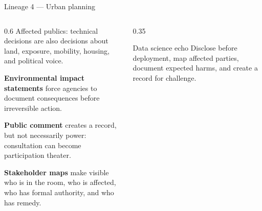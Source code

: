 \documentclass[9pt,aspectratio=169]{beamer}
\begin{document}
\begin{frame}{Lineage 4 --- Urban planning}
    \begin{columns}[T]
        \begin{column}{0.6\textwidth}
            Affected publics: technical decisions are also decisions about land, exposure, mobility, housing, and political voice.

            \medskip

            \textbf{Environmental impact statements} force agencies to document consequences before irreversible action.

            \medskip

            \textbf{Public comment} creates a record, but not necessarily power: consultation can become participation theater.

            \medskip

            \textbf{Stakeholder maps} make visible who is in the room, who is affected, who has formal authority, and who has remedy.
            
        \end{column}
        \begin{column}{0.35\textwidth}
            \begin{alertblock}{Data science echo}
                \small
                Disclose before deployment, map affected parties, document expected harms, and create a record for challenge.
            \end{alertblock}
        \end{column}
    \end{columns}
\end{frame}
\end{document}
